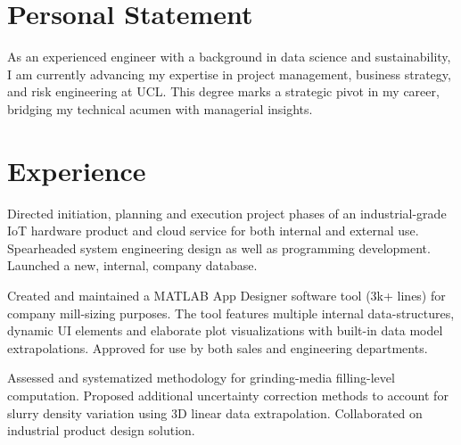 \documentclass[]{plushcv}
\begin{document}
\thispagestyle{empty}

\begin{minipage}[t]{0.70\textwidth} 

\section{Personal Statement}
{\justifying As an experienced engineer with a background in data science and sustainability, I am currently advancing my expertise in project management, business strategy, and risk engineering at UCL. This degree marks a strategic pivot in my career, bridging my technical acumen with managerial insights.}



\section{Experience}
	\vspace{\topsep} %
	\begin{tightemize}
		\item Directed initiation, planning and execution project phases of an industrial-grade IoT hardware product and cloud service for both internal and external use. Spearheaded system engineering design as well as programming development. Launched a new, internal, company database.
		\item Created and maintained a MATLAB App Designer software tool (3k+ lines) for company mill-sizing purposes. The tool features multiple internal data-structures, dynamic UI elements and elaborate plot visualizations with built-in data model extrapolations. Approved for use by both sales and engineering departments.
		\item Assessed and systematized methodology for grinding-media filling-level computation. Proposed additional uncertainty correction methods to account for slurry density variation using 3D linear data extrapolation. Collaborated on industrial product design solution.
	\end{tightemize}
	\subskip
	

\end{minipage}
\end{document}

